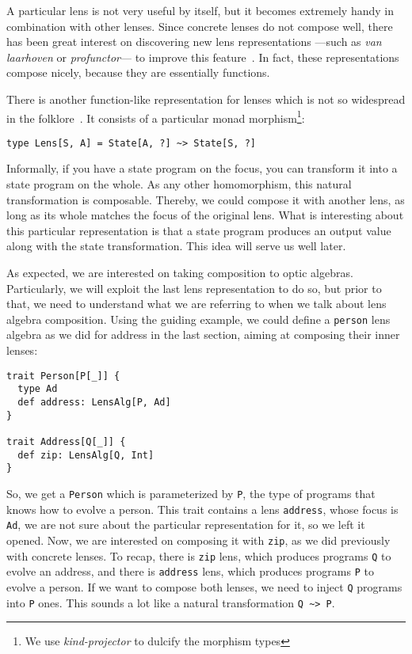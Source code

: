 \documentclass[preview, 3p]{elsarticle}
\begin{document}
A particular lens is not very useful by itself, but it becomes extremely handy
in combination with other lenses. Since concrete lenses do not compose well,
there has been great interest on discovering new lens representations ---such
as \emph{van laarhoven} or \emph{profunctor}--- to improve this
feature~\cite{pickering2017profunctor}. In fact, these representations compose
nicely, because they are essentially functions.

There is another function-like representation for lenses which is not so
widespread in the folklore~\cite{abou2015notions}. It consists of a particular
monad morphism\footnote{We use \emph{kind-projector} to dulcify the morphism
types}:
\begin{lstlisting}
type Lens[S, A] = State[A, ?] ~> State[S, ?]
\end{lstlisting}
Informally, if you have a state program on the focus, you can transform it into
a state program on the whole. As any other homomorphism, this natural
transformation is composable. Thereby, we could compose it with another lens, as
long as its whole matches the focus of the original lens. What is interesting
about this particular representation is that a state program produces an output
value along with the state transformation. This idea will serve us well later.

As expected, we are interested on taking composition to optic algebras.
Particularly, we will exploit the last lens representation to do so, but prior
to that, we need to understand what we are referring to when we talk about lens
algebra composition. Using the guiding example, we could define a
\lstinline{person} lens algebra as we did for address in the last section,
aiming at composing their inner lenses:
\begin{lstlisting}
trait Person[P[_]] {
  type Ad
  def address: LensAlg[P, Ad]
}

trait Address[Q[_]] {
  def zip: LensAlg[Q, Int]
}
\end{lstlisting}
So, we get a \lstinline{Person} which is parameterized by \lstinline{P}, the
type of programs that knows how to evolve a person. This trait contains a lens
\lstinline{address}, whose focus is \lstinline{Ad}, we are not sure about the
particular representation for it, so we left it opened. Now, we are interested
on composing it with \lstinline{zip}, as we did previously with concrete lenses.
To recap, there is \lstinline{zip} lens, which produces programs \lstinline{Q}
to evolve an address, and there is \lstinline{address} lens, which produces
programs \lstinline{P} to evolve a person. If we want to compose both lenses, we
need to inject \lstinline{Q} programs into \lstinline{P} ones. This sounds a lot
like a natural transformation \lstinline{Q ~> P}.
\end{document}
